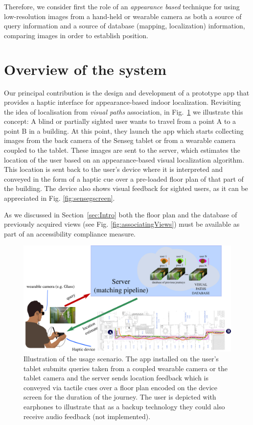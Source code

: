 Therefore, we consider first the role of an {\em appearance based} technique for using low-resolution images from a hand-held or wearable camera as both a source of query information and a source of database (mapping, localization) information, comparing images in order to establish position. 

\section{Overview of the system}
\label{sec:overview}

Our principal contribution is the design and development of a prototype app that provides a haptic interface for appearance-based indoor localization. Revisiting the idea of localisation from \emph{visual paths} association, in Fig.~\ref{fig:overview} we illustrate this concept: A blind or partially sighted user wants to travel from a point A to a point B in a building. At this point, they launch the app which starts collecting images from the back camera of the Senseg tablet or from a wearable camera coupled to the tablet. These images are sent to the server, which estimates the location of the user based on an appearance-based visual localization algorithm. This location is sent back to the user's device where it is interpreted and conveyed in the form of a haptic cue over a pre-loaded floor plan of that part of the building. The device also shows visual feedback for sighted users, as it can be appreciated in Fig. \ref{fig:sensegscreen}.

As we discussed in Section~\ref{sec:Intro} both the floor plan and the database of previously acquired views (see Fig. \ref{fig:associatingViews}) must be available as part of an accessibility compliance measure.


\begin{figure}
\centering
\includegraphics[width=\textwidth]{gfx/Chapter06/overview.png}
\caption{Illustration of the usage scenario. The app installed on the user's tablet submits queries taken from a coupled wearable camera or the tablet camera and the server sends location feedback which is conveyed via tactile cues over a floor plan encoded on the device screen for the duration of the journey. The user is depicted with earphones to illustrate that as a backup technology they could also receive audio feedback (not implemented).}
\label{fig:overview}
\end{figure}

